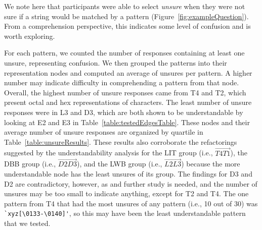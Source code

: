 We note here that participants were able to select \emph{unsure} when they were not sure if a string would be matched by a pattern (Figure~\ref{fig:exampleQuestion}). From a comprehension perspective, this indicates some level of confusion and is worth exploring.



For each pattern, we counted the number of responses containing at least one unsure, representing confusion.
We then grouped the patterns into their representation nodes and computed an average of unsures per pattern.
A higher number may indicate difficulty in comprehending a pattern from that node.
Overall, the highest number of unsure responses came from T4 and T2, which present octal and hex representations of characters. The least number of unsure responses were in L3 and D3, which are both shown to be understandable by looking at E2 and E3 in Table~\ref{table:testedEdgesTable}.
These nodes and their average number of unsure responses are organized by quartile in Table~\ref{table:unsureResults}.
These results also corroborate the refactorings suggested by the understandability analysis for the LIT group (i.e., $\overrightarrow{T4 T1}$), the DBB group (i.e.,  $\overrightarrow{D2 D3}$), and the LWB group (i.e., $\overrightarrow{L2 L3}$) because the more understandable node has the least unsures of its group.
The findings for D3 and D2 are contradictory, however, as  and further study is needed, and the number of unsures may be too small to indicate anything, except for T2 and T4.  The one pattern from T4 that had the most unsures of any pattern (i.e., 10 out of 30) was \verb!`xyz[\0133-\0140]'!, so this may have been the least understandable pattern that we tested.

